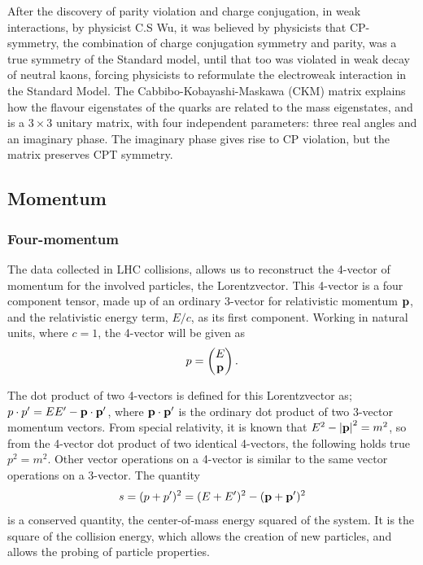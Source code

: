\documentclass[12pt,a4paper]{article}
\numberwithin{equation}{section}
\begin{document}
After the discovery of parity violation and charge conjugation, in weak
interactions, by physicist C.S Wu\cite{PhysRev.105.1413}, it was believed by
physicists that CP-symmetry, the combination of charge conjugation symmetry and
parity, was a true symmetry of the Standard model, until that too was violated
in weak decay of neutral kaons, forcing physicists to reformulate the
electroweak interaction in the Standard Model. The Cabbibo-Kobayashi-Maskawa
(CKM) matrix explains how the flavour eigenstates of the quarks are related to
the mass eigenstates, and is a $3 \times 3$ unitary matrix, with four independent
parameters: three real angles and an imaginary phase\cite[153]{Povh2015}. The
imaginary phase gives rise to CP violation, but the matrix preserves CPT
symmetry.

\subsection{Momentum}\label{sec:momentum}

\subsubsection{Four-momentum}
The data collected in LHC collisions, allows us to reconstruct the 4-vector of
momentum for the involved particles, the Lorentzvector. This 4-vector is a four
component tensor, made up of an ordinary 3-vector for relativistic momentum
$\vb p$, and the relativistic energy term, $E/c$, as its first component.
Working in natural units, where $c=1$, the 4-vector will be given as
\begin{equation}
p = \left(\begin{matrix} E \\ \vb p \end{matrix} \right).
\end{equation}

The dot product of two 4-vectors is defined for this Lorentzvector as;
$p\cdot p' = E E' - \vb p \cdot \vb{p'}$, where $\vb p \cdot \vb{p'}$ is the ordinary dot
product of two 3-vector momentum vectors. From special relativity, it is known
that $E^2 - \abs{\vb p}^2 = m^2$, so from the 4-vector dot product of two
identical 4-vectors, the following holds true $p^2 = m^2$. Other vector
operations on a 4-vector is similar to the same vector operations on a
3-vector. The quantity
\begin{equation}
s = (p + p')^2 = (E + E')^2 - (\vb p + \vb p')^2
\end{equation}
is a conserved quantity, the center-of-mass energy squared of the system. It is
the square of the collision energy, which allows the creation of new particles,
and allows the probing of particle properties.
\end{document}
